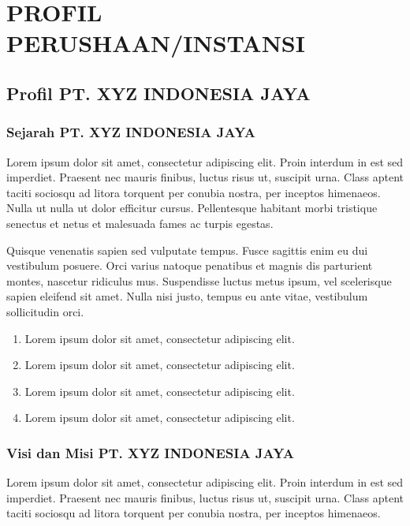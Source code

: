 \chapter{PROFIL PERUSHAAN/INSTANSI}

\section{Profil PT. XYZ INDONESIA JAYA}

\subsection{Sejarah PT. XYZ INDONESIA JAYA}

Lorem ipsum dolor sit amet, consectetur adipiscing elit. Proin interdum in est sed imperdiet. Praesent nec mauris finibus, luctus risus ut, suscipit urna. Class aptent taciti sociosqu ad litora torquent per conubia nostra, per inceptos himenaeos. Nulla ut nulla ut dolor efficitur cursus. Pellentesque habitant morbi tristique senectus et netus et malesuada fames ac turpis egestas.

Quisque venenatis sapien sed vulputate tempus. Fusce sagittis enim eu dui vestibulum posuere. Orci varius natoque penatibus et magnis dis parturient montes, nascetur ridiculus mus. Suspendisse luctus metus ipsum, vel scelerisque sapien eleifend sit amet. Nulla nisi justo, tempus eu ante vitae, vestibulum sollicitudin orci.
\begin{enumerate}
    \item Lorem ipsum dolor sit amet, consectetur adipiscing elit.
    \item Lorem ipsum dolor sit amet, consectetur adipiscing elit.
    \item Lorem ipsum dolor sit amet, consectetur adipiscing elit.
    \item Lorem ipsum dolor sit amet, consectetur adipiscing elit.
\end{enumerate}

\subsection{Visi dan Misi PT. XYZ INDONESIA JAYA}

Lorem ipsum dolor sit amet, consectetur adipiscing elit. Proin interdum in est sed imperdiet. Praesent nec mauris finibus, luctus risus ut, suscipit urna. Class aptent taciti sociosqu ad litora torquent per conubia nostra, per inceptos himenaeos.

